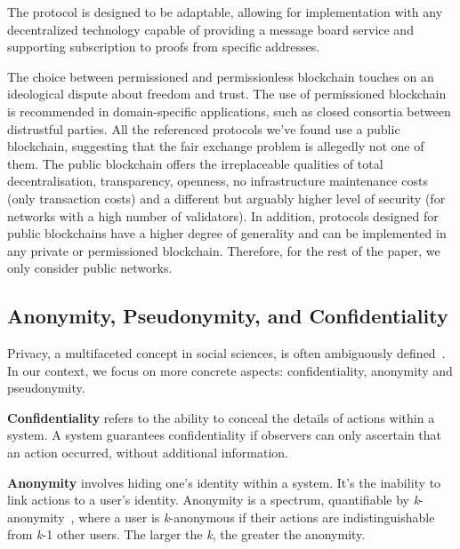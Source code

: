 \documentclass[pdftex,twocolumn,epjc3]{svjour3}
\begin{document}
The protocol is designed to be adaptable, allowing for implementation with any decentralized technology capable of providing a message board service and supporting subscription to proofs from specific addresses.

\begin{sloppypar}
The choice between permissioned and permissionless blockchain touches on an ideological dispute about freedom and trust. The use of permissioned blockchain is recommended in domain-specific applications, such as closed consortia between distrustful parties. All the referenced protocols we've found use a public blockchain, suggesting that the fair exchange problem is allegedly not one of them. The public blockchain offers the irreplaceable qualities of total decentralisation, transparency, openness, no infrastructure maintenance costs (only transaction costs) and a different but arguably higher level of security (for networks with a high number of validators). In addition, protocols designed for public blockchains have a higher degree of generality and can be implemented in any private or permissioned blockchain. Therefore, for the rest of the paper, we only consider public networks.
\end{sloppypar}

\subsection{Anonymity, Pseudonymity, and Confidentiality}\label{sec:pseudo-anon}

\begin{sloppypar}
Privacy, a multifaceted concept in social sciences, is often ambiguously defined~\cite{smithInformationPrivacyResearch2011}. In our context, we focus on more concrete aspects: confidentiality, anonymity and pseudonymity.
\end{sloppypar}

\textbf{Confidentiality} refers to the ability to conceal the details of actions within a system. A system guarantees confidentiality if observers can only ascertain that an action occurred, without additional information.

\textbf{Anonymity} involves hiding one's identity within a system. It's the inability to link actions to a user's identity. Anonymity is a spectrum, quantifiable by \textit{k}-anonymity~\cite{sweeneyKanonymityModelProtecting2002}, where a user is \textit{k}-anonymous if their actions are indistinguishable from \textit{k}-1 other users. The larger the \textit{k}, the greater the anonymity.
\end{document}
